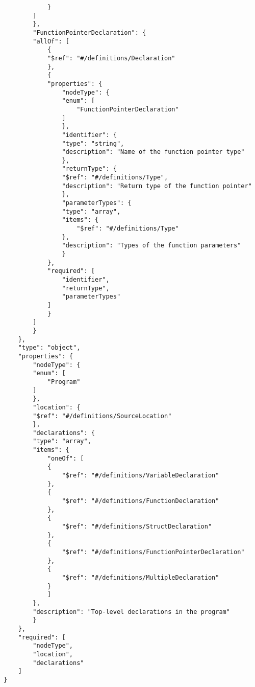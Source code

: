 \begin{lstlisting}
            }
        ]
        },
        "FunctionPointerDeclaration": {
        "allOf": [
            {
            "$ref": "#/definitions/Declaration"
            },
            {
            "properties": {
                "nodeType": {
                "enum": [
                    "FunctionPointerDeclaration"
                ]
                },
                "identifier": {
                "type": "string",
                "description": "Name of the function pointer type"
                },
                "returnType": {
                "$ref": "#/definitions/Type",
                "description": "Return type of the function pointer"
                },
                "parameterTypes": {
                "type": "array",
                "items": {
                    "$ref": "#/definitions/Type"
                },
                "description": "Types of the function parameters"
                }
            },
            "required": [
                "identifier",
                "returnType",
                "parameterTypes"
            ]
            }
        ]
        }
    },
    "type": "object",
    "properties": {
        "nodeType": {
        "enum": [
            "Program"
        ]
        },
        "location": {
        "$ref": "#/definitions/SourceLocation"
        },
        "declarations": {
        "type": "array",
        "items": {
            "oneOf": [
            {
                "$ref": "#/definitions/VariableDeclaration"
            },
            {
                "$ref": "#/definitions/FunctionDeclaration"
            },
            {
                "$ref": "#/definitions/StructDeclaration"
            },
            {
                "$ref": "#/definitions/FunctionPointerDeclaration"
            },
            {
                "$ref": "#/definitions/MultipleDeclaration"
            }
            ]
        },
        "description": "Top-level declarations in the program"
        }
    },
    "required": [
        "nodeType",
        "location",
        "declarations"
    ]
}
\end{lstlisting}





